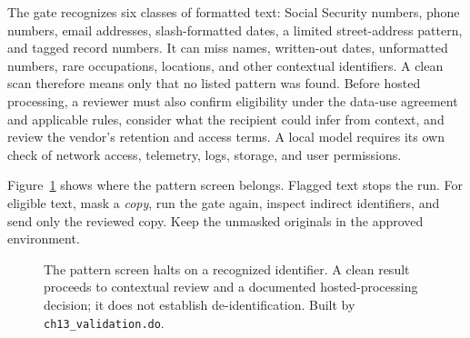 The gate recognizes six classes of formatted text: Social Security numbers, phone numbers, email addresses, slash-formatted dates, a limited street-address pattern, and tagged record numbers. It can miss names, written-out dates, unformatted numbers, rare occupations, locations, and other contextual identifiers. A clean scan therefore means only that no listed pattern was found. Before hosted processing, a reviewer must also confirm eligibility under the data-use agreement and applicable rules, consider what the recipient could infer from context, and review the vendor's retention and access terms. A local model requires its own check of network access, telemetry, logs, storage, and user permissions.

Figure~\ref{fig:ch13-aigate} shows where the pattern screen belongs. Flagged text stops the run. For eligible text, mask a \emph{copy}, run the gate again, inspect indirect identifiers, and send only the reviewed copy. Keep the unmasked originals in the approved environment.

\begin{figure}[htbp]
\centering
{}
\caption[The privacy pattern screen in a coding pipeline]{The pattern screen halts on a recognized identifier. A clean result proceeds to contextual review and a documented hosted-processing decision; it does not establish de-identification. Built by \texttt{ch13\_validation.do}.}
\label{fig:ch13-aigate}
\end{figure}

